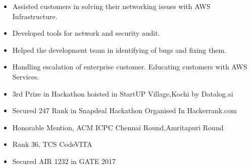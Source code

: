 \documentclass[10pt,a4paper,ragged2e]{altacv}
\begin{document}
\divider

\begin{itemize}
\item Assisted customers in solving their networking issues with AWS Infrastructure.
\smallskip
\item Developed tools for network and security audit.
\item Helped the development team in identifying of bugs and fixing them. 
\item Handling escalation of enterprise customer. Educating customers with AWS Services.
\end{itemize}


\smallskip
\begin{itemize}
\item 3rd Prize in Hackathon hoisted in StartUP Village,Kochi by Datalog.ai
\smallskip
\item Secured 247 Rank in Snapdeal Hackathon Organised In Hackerrank.com
\smallskip
\item Honorable Mention, ACM ICPC Chennai Round,Amritapuri Round
\smallskip
\item Rank 36, TCS CodeVITA
\smallskip
\item Secured AIR 1232 in GATE 2017
\end{itemize}


{}


{}


\end{document}
